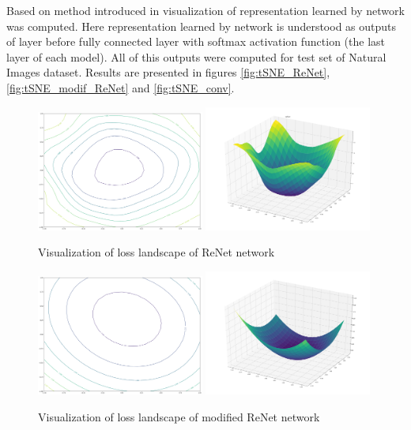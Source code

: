 \documentclass[a4paper, 10 pt, journal]{ieeeconf}
\begin{document}
Based on method introduced in \cite{tSNE} visualization of representation learned by network was computed. Here representation learned by network is understood as outputs of layer before fully connected layer with softmax activation function (the last layer of each model). All of this outputs were computed for test set of Natural Images dataset. Results are presented in figures \ref{fig:tSNE_ReNet}, \ref{fig:tSNE_modif_ReNet} and \ref{fig:tSNE_conv}.

\begin{figure}
\centering
	\includegraphics[width=0.49\textwidth]{img/loss_ReNet.png}
	\includegraphics[width=0.49\textwidth]{img/loss_3d_ReNet.png}
	\caption{Visualization of loss landscape of ReNet network}
	\label{fig:loss_ReNet}
\end{figure}

\begin{figure}
\centering
	\includegraphics[width=0.49\textwidth]{img/loss_modif_ReNet.png}
	\includegraphics[width=0.49\textwidth]{img/loss_3d_modif_ReNet.png}
	\caption{Visualization of loss landscape of modified ReNet network}
	\label{fig:loss_modif_ReNet}
\end{figure}
\end{document}
